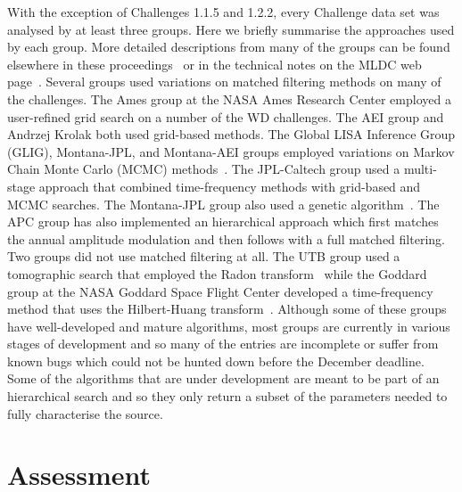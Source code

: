 \documentclass[12pt]{iopart}
\begin{document}
With the exception of Challenges 1.1.5 and 1.2.2, every Challenge data set was analysed by at least three groups. Here we briefly summarise the approaches used by each group. More detailed descriptions from many of the groups can be found elsewhere in these proceedings~\cite{auger07,camp07,crowder07,cutler07,auger07,nayak07, porter07,prix07, roever07, stroeer07,thompson07} or in the technical notes on the MLDC web page~\cite{MLDCweb}. Several groups used variations on matched filtering methods on many of the challenges. The Ames group at the NASA Ames Research Center employed a user-refined grid search on a number of the WD challenges. The AEI group and Andrzej Krolak both used grid-based methods. The Global LISA Inference Group (GLIG), Montana-JPL, and Montana-AEI groups employed variations on Markov Chain Monte Carlo (MCMC) methods~\cite{gilks96}. The JPL-Caltech group used a multi-stage approach that combined time-frequency methods with grid-based and MCMC searches. The Montana-JPL group also used a genetic algorithm~\cite{holland75}. The APC group has also implemented an hierarchical approach which first matches the annual amplitude modulation and then follows with a full matched filtering. Two groups did not use matched filtering at all. The UTB group used a tomographic search that employed the Radon transform~\cite{deans83} while the Goddard group at the NASA Goddard Space Flight Center developed a time-frequency method that uses the Hilbert-Huang transform~\cite{huang98}. Although some of these groups have well-developed and mature algorithms, most groups are currently in various stages of development and so many of the entries are incomplete or suffer from known bugs which could not be hunted down before the December deadline. Some of the algorithms that are under development are meant to be part of an hierarchical search and so they only return a subset of the parameters needed to fully characterise the source.

\section{Assessment}
\end{document}

